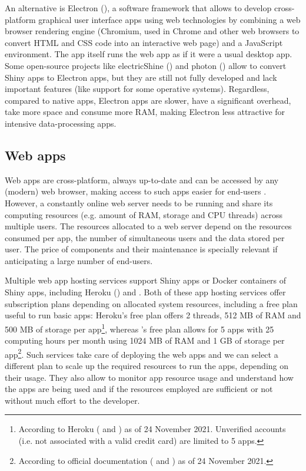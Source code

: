 An alternative is Electron (), a software framework that allows to develop cross-platform graphical user interface apps using web technologies by combining a web browser rendering engine (Chromium, used in Chrome and other web browsers to convert HTML and CSS code into an interactive web page) and a JavaScript environment. The app itself runs the web app as if it were a usual desktop app. Some open-source projects like electricShine () and photon () allow to convert Shiny apps to Electron apps, but they are still not fully developed and lack important features (like support for some operative systems). Regardless, compared to native apps, Electron apps are slower, have a significant overhead, take more space and consume more RAM, making Electron less attractive for intensive data-processing apps.

\subsection{Web apps}

Web apps are cross-platform, always up-to-date and can be accessed by any (modern) web browser, making access to such apps easier for end-users \cite{silva:2017wl}. However, a constantly online web server needs to be running and share its computing resources (e.g. amount of RAM, storage and CPU threads) across multiple users. The resources allocated to a web server depend on the resources consumed per app, the number of simultaneous users and the data stored per user. The price of components and their maintenance is specially relevant if anticipating a large number of end-users.

Multiple web app hosting services support Shiny apps or Docker containers of Shiny apps, including Heroku () and . Both of these app hosting services offer subscription plans depending on allocated system resources, including a free plan useful to run basic apps: Heroku's free plan offers 2 threads, 512 MB of RAM and 500 MB of storage per app\footnote{According to Heroku ( and ) as of 24 November 2021. Unverified accounts (i.e. not associated with a valid credit card) are limited to 5 apps.}, whereas 's free plan allows for 5 apps with 25 computing hours per month using 1024 MB of RAM and 1 GB of storage per app\footnote{According to official  documentation ( and ) as of 24 November 2021.}. Such services take care of deploying the web apps and we can select a different plan to scale up the required resources to run the apps, depending on their usage. They also allow to monitor app resource usage and understand how the apps are being used and if the resources employed are sufficient or not without much effort to the developer.

